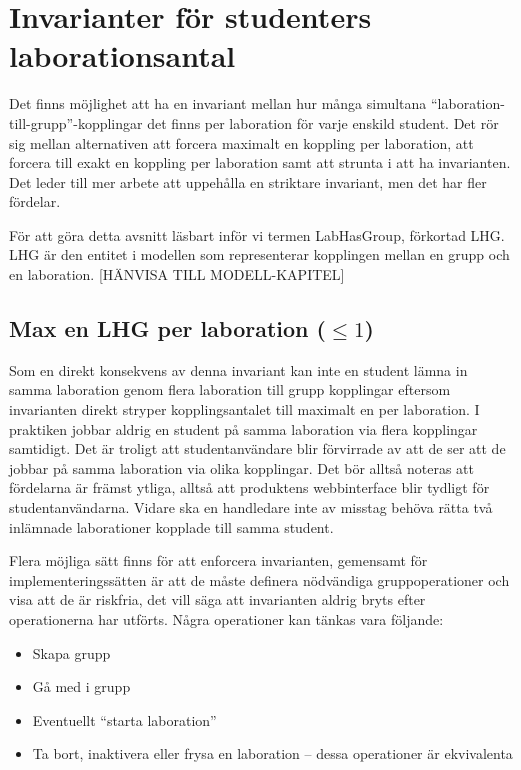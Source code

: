 \section{Invarianter för studenters laborationsantal}

Det finns möjlighet att ha en invariant mellan hur många simultana “laboration-till-grupp”-kopplingar det finns per laboration för varje enskild student. Det rör sig mellan alternativen att forcera maximalt en koppling per laboration, att forcera till exakt en koppling per laboration samt att strunta i att ha invarianten. Det leder till mer arbete att uppehålla en striktare invariant, men det har fler fördelar.

För att göra detta avsnitt läsbart inför vi termen LabHasGroup, förkortad LHG. LHG är den entitet i modellen som representerar kopplingen mellan en grupp och en laboration. [HÄNVISA TILL MODELL-KAPITEL]

\subsection{Max en LHG per laboration ($\leq 1$)}
Som en direkt konsekvens av denna invariant kan inte en student lämna in samma laboration genom flera laboration till grupp kopplingar eftersom invarianten direkt stryper kopplingsantalet till maximalt en per laboration. I praktiken jobbar aldrig en student på samma laboration via flera kopplingar samtidigt. Det är troligt att studentanvändare blir förvirrade av att de ser att de jobbar på samma laboration via olika kopplingar. Det bör alltså noteras att fördelarna är främst  ytliga, alltså att produktens webbinterface blir tydligt för studentanvändarna. Vidare ska en handledare inte av misstag behöva rätta två inlämnade laborationer kopplade till samma student.

Flera möjliga sätt finns för att enforcera invarianten, gemensamt för implementeringssätten är att de måste definera nödvändiga gruppoperationer och visa att de är riskfria, det vill säga att invarianten aldrig bryts efter operationerna har utförts. Några operationer kan tänkas vara följande:

\begin{itemize}
  \item Skapa grupp
  \item Gå med i grupp
  \item Eventuellt “starta laboration”
  \item Ta bort,  inaktivera eller frysa en laboration – dessa operationer är ekvivalenta
\end{itemize} 

